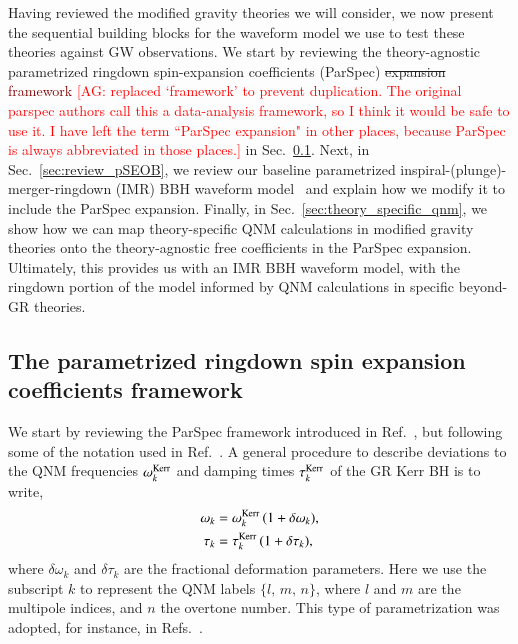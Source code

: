 \documentclass[twocolumn,
               prd,
               aps,
               superscriptaddress,
               tightenlines,
               nofootinbib,
               eqsecnum,
               amsfonts,
               amsmath,
               longbibliography]{revtex4-1}
\newcommand{\agcomm}[1]{{\textcolor{red}{{[AG: #1]}} }}
\newcommand{\ag}[1]{{\textcolor{Maroon}{{#1}} }}
\begin{document}
Having reviewed the modified gravity theories we will consider, we now present
the sequential building blocks for the waveform model we use to test these theories
against GW observations.
%
We start by reviewing the theory-agnostic parametrized ringdown
spin-expansion coefficients (ParSpec) \sout{expansion} \ag{framework} \agcomm{replaced `framework' to prevent duplication.  The original parspec authors call this a data-analysis framework, so I think it would be safe to use it. I have left the term ``ParSpec expansion" in other places, because ParSpec is always abbreviated in those places.} in Sec.~\ref{sec:review_parspec}.
%
Next, in Sec.~\ref{sec:review_pSEOB}, we review our baseline
parametrized inspiral-(plunge)-merger-ringdown (IMR) BBH waveform
model~\cite{Brito:2018rfr,Ghosh:2021mrv} and explain how we modify
it to include the ParSpec expansion.
%
Finally, in Sec.~\ref{sec:theory_specific_qnm}, we show how we can map
theory-specific QNM calculations in modified gravity theories onto the
theory-agnostic free coefficients in the ParSpec expansion.
%
Ultimately, this provides us with an IMR BBH waveform model, with the ringdown
portion of the model informed by QNM calculations in specific beyond-GR
theories.

\subsection{The parametrized ringdown spin expansion coefficients framework}
\label{sec:review_parspec}

We start by reviewing the ParSpec
framework introduced in Ref.~\cite{Maselli:2019mjd}, but following
some of the notation used in Ref.~\cite{Carullo:2021dui}.
%
A general procedure to describe deviations to the QNM frequencies $\omega_{k}^{\rm Kerr}$ and
damping times $\tau_{k}^{\rm Kerr}$ of the GR Kerr BH is to write,
%
\begin{subequations}
\label{eq:general_deviation}
\begin{align}
\omega_{k} &= \omega^{\rm Kerr}_{k} \, (1 + \delta \omega_{k}), \\
\tau_{k}   &= \tau^{\rm Kerr}_{k}   \, (1 + \delta \tau_{k}),
\end{align}
\end{subequations}
%
where $\delta\omega_{k}$ and $\delta\tau_{k}$ are the fractional deformation parameters.
%
Here we use the subscript $k$ to represent the QNM labels $\{l,\, m,\, n\}$,
where $l$ and $m$ are the multipole indices, and $n$ the overtone number.
%
This type of parametrization was adopted, for instance, in Refs.~\cite{Gossan:2011ha,Meidam:2014jpa,Carullo:2018sfu}.
\end{document}
